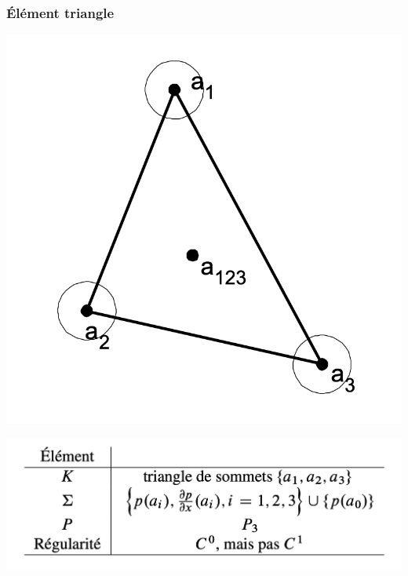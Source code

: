 \documentclass{beamer}
\begin{document}
\begin{frame}
\frametitle{Élément triangle}


\begin{center}
\includegraphics[scale=0.3]{hermiteTriangleUN.png} 
\end{center}
\begin{center}
\includegraphics[scale=0.3]{hermiteTriangle1.png} 
\end{center}
\end{frame}
\end{document}
